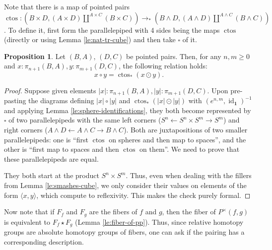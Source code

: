 \documentclass{amsart}
\theoremstyle{definition}
\newtheorem{prp}[theorem]{Proposition}
\newcommand{\id}{\operatorname{id}}
\newcommand{\pto}{\to_*}
\newcommand{\sgtn}{\mathbf{1}}
\newcommand{\ctos}{\operatorname{ctos}}
\newcommand{\join}{\star}
\begin{document}
Note that there is a map of pointed pairs $\ctos: (B \times D, {(A \times D) \coprod^{A \times C} (B \times C)}) \pto (B \wedge D, {(A \wedge D) \coprod^{A \wedge C} (B \wedge C)})$. To define it, first form the parallelepiped with 4 sides being the maps $\ctos$ (directly or using Lemma \ref{le:nat-tr-cube}) and then take $\square$ of it.
\begin{prp}\label{pr:cross-factors-wedge}
    Let $(B, A)$, $(D, C)$ be pointed pairs.
    Then, for any $n,m \ge 0$ and $x : \pi_{n+1}(B,A), y : \pi_{m+1}(D,C)$, the following relation holds:
    $$x \circ y = \ctos_* (x \odot y).$$
\end{prp}
\begin{proof}
    Suppose given elements $|x| : \pi_{n+1}(B,A), |y| : \pi_{m+1}(D,C)$. Upon pre-pasting the diagrams defining $|x| \circ |y|$ and $\ctos_* (|x| \odot |y|)$ with $(e^{n,m}, \id_{\sgtn})^{-1}$ and applying Lemma \ref{le:sphere-identifications}, they both become represented by $\square$ of two parallelepipeds with the same left corners ($S^n \xleftarrow{} S^n \times S^m \xrightarrow{} S^m$) and right corners ($A \wedge D \xleftarrow{} A \wedge C \xrightarrow{} B \wedge C$). Both are juxtapositions of two smaller parallelepipeds: one is ``first $\ctos$ on spheres and then map to spaces'', and the other is ``first map to spaces and then $\ctos$ on them''. We need to prove that these parallelepipeds are equal.

    They both start at the product $S^n \times S^m$. Thus, even when dealing with the fillers from Lemma \ref{le:smashes-cube}, we only consider their values on elements of the form $\langle x, y \rangle$, which compute to reflexivity. This makes the check purely formal.
\end{proof}


Now note that if $F_f$ and $F_g$ are the fibers of $f$ and $g$, then the fiber of $P^{\times}(f,g)$ is equivalent to $F_f \join F_g$ (Lemma \ref{le:fiber-of-pp}). Thus, since relative homotopy groups are absolute homotopy groups of fibers, one can ask if the pairing has a corresponding description.
\end{document}
